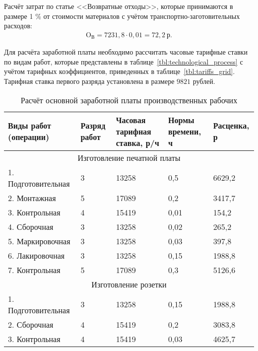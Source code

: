 Расчёт затрат по статье <<Возвратные отходы>>, которые принимаются в размере
1 \% от стоимости материалов с учётом транспортно-заготовительных расходов:
\begin{align}
  \text{O}_{\text{В}} = 7231{,}8 \cdot 0{,}01 = 72{,}2 \: \text{р.}  \nonumber
\end{align}

\newpage

Для расчёта заработной платы необходимо рассчитать часовые тарифные ставки по
видам работ, которые представлены в таблице~\ref{tbl:technological_process}
с учётом тарифных коэффициентов, приведенных в таблице~\ref{tbl:tariffs_grid}.
Тарифная ставка первого разряда установлена в размере $ 9821 $ рублей.

\begin{table}[h!]
  \caption{Расчёт основной заработной платы производственных рабочих}
  \label{tbl:technological_process_result}
  \centering
  \small{
    \begin{tabular}{| p{} | p{} | p{} |
                      p{} | p{} |}
      \hline
      Виды работ (операции) &
      Разряд работ &
      Часовая \newline тарифная \newline ставка, р/ч &
      Нормы \newline времени, ч &
      Расценка, р \\ \hline

      \multicolumn{5}{|c|}{Изготовление печатной платы} \\ \hline
      1. Подготовительная & 3 & 13258 & 0,5  & 6629,2  \\ \hline
      2. Монтажная        & 5 & 17089 & 0,2  & 3417,7  \\ \hline
      3. Контрольная      & 4 & 15419 & 0,01 & 154,2   \\ \hline
      4. Сборочная        & 3 & 13258 & 0,02 & 265,2   \\ \hline
      5. Маркировочная    & 3 & 13258 & 0,03 & 397,8   \\ \hline
      6. Лакировочная     & 3 & 13258 & 0,15 & 1988,8  \\ \hline
      7. Контрольная      & 5 & 17089 & 0,3  & 5126,6  \\ \hline

      \multicolumn{5}{|c|}{Изготовление розетки} \\ \hline
      1. Подготовительная & 3 & 13258 & 0,15 & 1988,8  \\ \hline
      2. Сборочная        & 4 & 15419 & 0,2  & 3083,8  \\ \hline
      3. Контрольная      & 4 & 15419 & 0,03 & 4625,7  \\ \hline


\end{tabular}}
\end{table}
